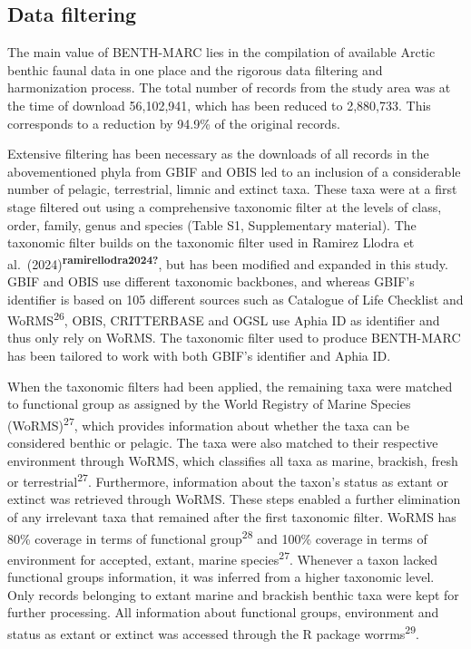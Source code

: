 \documentclass[
  letterpaper,
  DIV=11,
  numbers=noendperiod]{scrartcl}
\begin{document}
\subsection{Data filtering}\label{data-filtering}

The main value of BENTH-MARC lies in the compilation of available Arctic
benthic faunal data in one place and the rigorous data filtering and
harmonization process. The total number of records from the study area
was at the time of download 56,102,941, which has been reduced to
2,880,733. This corresponds to a reduction by 94.9\% of the original
records.

Extensive filtering has been necessary as the downloads of all records
in the abovementioned phyla from GBIF and OBIS led to an inclusion of a
considerable number of pelagic, terrestrial, limnic and extinct taxa.
These taxa were at a first stage filtered out using a comprehensive
taxonomic filter at the levels of class, order, family, genus and
species (Table S1, Supplementary material). The taxonomic filter builds
on the taxonomic filter used in Ramirez Llodra et
al.~(2024)\textsuperscript{\textbf{ramirellodra2024?}}, but has been
modified and expanded in this study. GBIF and OBIS use different
taxonomic backbones, and whereas GBIF's identifier is based on 105
different sources such as Catalogue of Life Checklist and
WoRMS\textsuperscript{26}, OBIS, CRITTERBASE and OGSL use Aphia ID as
identifier and thus only rely on WoRMS. The taxonomic filter used to
produce BENTH-MARC has been tailored to work with both GBIF's identifier
and Aphia ID.

When the taxonomic filters had been applied, the remaining taxa were
matched to functional group as assigned by the World Registry of Marine
Species (WoRMS)\textsuperscript{27}, which provides information about
whether the taxa can be considered benthic or pelagic. The taxa were
also matched to their respective environment through WoRMS, which
classifies all taxa as marine, brackish, fresh or
terrestrial\textsuperscript{27}. Furthermore, information about the
taxon's status as extant or extinct was retrieved through WoRMS. These
steps enabled a further elimination of any irrelevant taxa that remained
after the first taxonomic filter. WoRMS has 80\% coverage in terms of
functional group\textsuperscript{28} and 100\% coverage in terms of
environment for accepted, extant, marine species\textsuperscript{27}.
Whenever a taxon lacked functional groups information, it was inferred
from a higher taxonomic level. Only records belonging to extant marine
and brackish benthic taxa were kept for further processing. All
information about functional groups, environment and status as extant or
extinct was accessed through the R package worrms\textsuperscript{29}.
\end{document}

